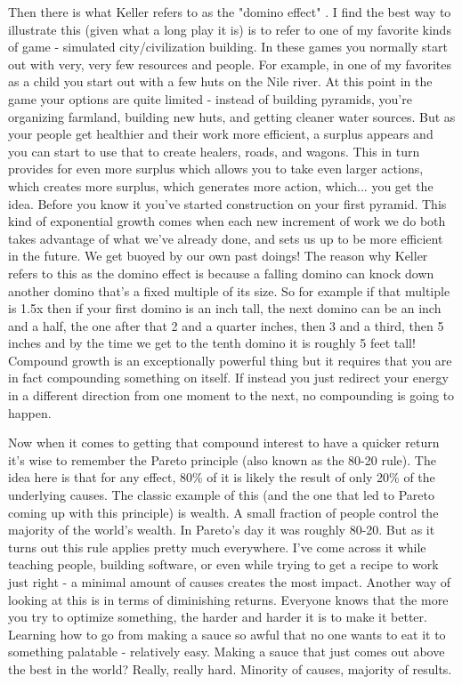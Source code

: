 \documentclass[11pt,a5paper]{book}
\begin{document}
Then there is what Keller refers to as the "domino effect" \cite{keller}. I find the best way to illustrate this (given what a long play it is) is to refer to one of my favorite kinds of game - simulated city/civilization building. In these games you normally start out with very, very few resources and people. For example, in one of my favorites as a child you start out with a few huts on the Nile river. At this point in the game your options are quite limited - instead of building pyramids, you're organizing farmland, building new huts, and getting cleaner water sources. But as your people get healthier and their work more efficient, a surplus appears and you can start to use that to create healers, roads, and wagons. This in turn provides for even more surplus which allows you to take even larger actions, which creates more surplus, which generates more action, which... you get the idea. Before you know it you've started construction on your first pyramid. This kind of exponential growth comes when each new increment of work we do both takes advantage of what we've already done, and sets us up to be more efficient in the future. We get buoyed by our own past doings! The reason why Keller refers to this as the domino effect is because a falling domino can knock down another domino that's a fixed multiple of its size. So for example if that multiple is 1.5x then if your first domino is an inch tall, the next domino can be an inch and a half, the one after that 2 and a quarter inches, then 3 and a third, then 5 inches and by the time we get to the tenth domino it is roughly 5 feet tall! Compound growth is an exceptionally powerful thing but it requires that you are in fact compounding something on itself. If instead you just redirect your energy in a different direction from one moment to the next, no compounding is going to happen.
\newline

Now when it comes to getting that compound interest to have a quicker return it's wise to remember the Pareto principle (also known as the 80-20 rule). The idea here is that for any effect, 80\% of it is likely the result of only 20\% of the underlying causes. The classic example of this (and the one that led to Pareto coming up with this principle) is wealth. A small fraction of people control the majority of the world's wealth. In Pareto's day it was roughly 80-20. But as it turns out this rule applies pretty much everywhere. I've come across it while teaching people, building software, or even while trying to get a recipe to work just right - a minimal amount of causes creates the most impact. Another way of looking at this is in terms of diminishing returns. Everyone knows that the more you try to optimize something, the harder and harder it is to make it better. Learning how to go from making a sauce so awful that no one wants to eat it to something palatable - relatively easy. Making a sauce that just comes out above the best in the world? Really, really hard. Minority of causes, majority of results. 
\newline
\end{document}
